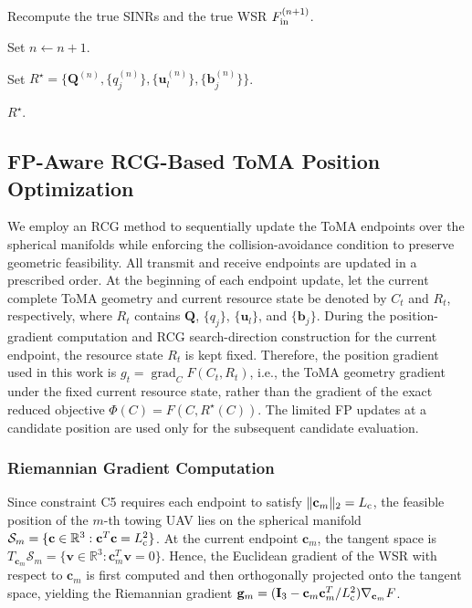 \documentclass[letterpaper,journal]{IEEEtran}
\begin{document}
\begin{algorithm}[t]
\begin{algorithmic}[1]
    \STATE Recompute the true SINRs and the true WSR
    $F_{\rm in}^{(n+1)}$.

    \STATE Set $n\leftarrow n+1$.


\STATE Set
$R^\star=
\{\mathbf Q^{(n)},
\{q_j^{(n)}\},
\{\mathbf u_l^{(n)}\},
\{\mathbf b_j^{(n)}\}\}$.

\RETURN $R^\star$.

\end{algorithmic}
\end{algorithm}
\subsection{FP-Aware RCG-Based ToMA Position Optimization}
\label{subsec:fpaware_rcg}

We employ an RCG method to sequentially update the ToMA endpoints over the spherical manifolds while enforcing the collision-avoidance condition to preserve geometric feasibility. All transmit and receive endpoints are updated in a prescribed order. At the beginning of each endpoint update, let the current complete ToMA geometry and current resource state be denoted by $C_t$ and $R_t$, respectively, where $R_t$ contains $\mathbf Q$, $\{q_j\}$, $\{\mathbf u_l\}$, and $\{\mathbf b_j\}$. During the position-gradient computation and RCG search-direction construction for the current endpoint, the resource state $R_t$ is kept fixed. Therefore, the position gradient used in this work is $g_t=\operatorname{grad}_{C}F(C_t,R_t)$, i.e., the ToMA geometry gradient under the fixed current resource state, rather than the gradient of the exact reduced objective $\Phi(C)=F(C,R^\star(C))$. The limited FP updates at a candidate position are used only for the subsequent candidate evaluation.

\subsubsection{Riemannian Gradient Computation}

Since constraint C5 requires each endpoint to satisfy $\|\mathbf c_m\|_2=L_{\rm c}$, the feasible position of the $m$-th towing UAV lies on the spherical manifold $\mathcal S_m=\{\mathbf c\in\mathbb R^3:\mathbf c^T\mathbf c=L_{\rm c}^2\}$. At the current endpoint $\mathbf c_m$, the tangent space is $T_{\mathbf c_m}\mathcal S_m=\{\mathbf v\in\mathbb R^3:\mathbf c_m^T\mathbf v=0\}$. Hence, the Euclidean gradient of the WSR with respect to $\mathbf c_m$ is first computed and then orthogonally projected onto the tangent space, yielding the Riemannian gradient $\mathbf g_m=(\mathbf I_3-\mathbf c_m\mathbf c_m^T/L_{\rm c}^2)\nabla_{\mathbf c_m}F$.
\end{document}
